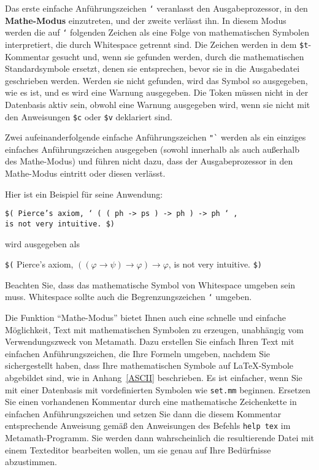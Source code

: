 Das erste einfache Anführungszeichen  \texttt{`} veranlasst den Ausgabeprozessor, in den {\bf Mathe-Modus} einzutreten, und der zweite verlässt ihn. In diesem Modus werden die auf \texttt{`} folgenden Zeichen als eine Folge von mathematischen Symbolen interpretiert, die durch Whitespace getrennt sind.  Die Zeichen werden in dem \texttt{\$t}-Kommentar  gesucht und, wenn sie gefunden werden, durch die mathematischen Standardsymbole ersetzt, denen sie entsprechen, bevor sie in die Ausgabedatei geschrieben werden.  Werden sie nicht gefunden, wird das Symbol so ausgegeben, wie es ist, und es wird eine Warnung ausgegeben. Die Token müssen nicht in der Datenbasis aktiv sein, obwohl eine Warnung ausgegeben wird, wenn sie nicht mit den Anweisungen \texttt{\$c} oder \texttt{\$v} deklariert sind.

Zwei aufeinanderfolgende einfache Anführungszeichen \texttt{"`} werden als ein einziges einfaches Anführungszeichen ausgegeben (sowohl innerhalb als auch außerhalb des Mathe-Modus) und führen nicht dazu, dass der Ausgabeprozessor in den Mathe-Modus eintritt oder diesen verlässt.

Hier ist ein Beispiel für seine Anwendung:
\begin{center}
\texttt{\$( Pierce's axiom, ` ( ( ph -> ps ) -> ph ) -> ph ` ,\\
         is not very intuitive. \$)}
\end{center}
wird ausgegeben als
\begin{center}
   \texttt{\$(} Pierce's axiom, $((\varphi \rightarrow \psi)\rightarrow
\varphi)\rightarrow \varphi$, is not very intuitive. \texttt{\$)}
\end{center}

Beachten Sie, dass das mathematische Symbol von Whitespace umgeben sein muss.
Whitespace sollte auch die Begrenzungszeichen \texttt{`} umgeben.

Die Funktion "`Mathe-Modus"' bietet Ihnen auch eine schnelle und einfache Möglichkeit, Text mit mathematischen Symbolen zu erzeugen, unabhängig vom Verwendungszweck von Metamath. Dazu erstellen Sie einfach Ihren Text mit einfachen Anführungszeichen, die Ihre Formeln umgeben, nachdem Sie sichergestellt haben, dass Ihre mathematischen Symbole auf \LaTeX-Symbole abgebildet sind, wie in Anhang~\ref{ASCII} beschrieben.  Es ist einfacher, wenn Sie mit einer Datenbasis mit vordefinierten Symbolen wie \texttt{set.mm} beginnen.  Ersetzen Sie einen vorhandenen Kommentar durch eine mathematische Zeichenkette in einfachen Anführungszeichen und setzen Sie dann die diesem Kommentar entsprechende Anweisung gemäß den Anweisungen des Befehls \texttt{help tex} im Metamath-Programm.  Sie werden dann wahrscheinlich die resultierende Datei mit einem Texteditor bearbeiten wollen, um sie genau auf Ihre Bedürfnisse abzustimmen.


